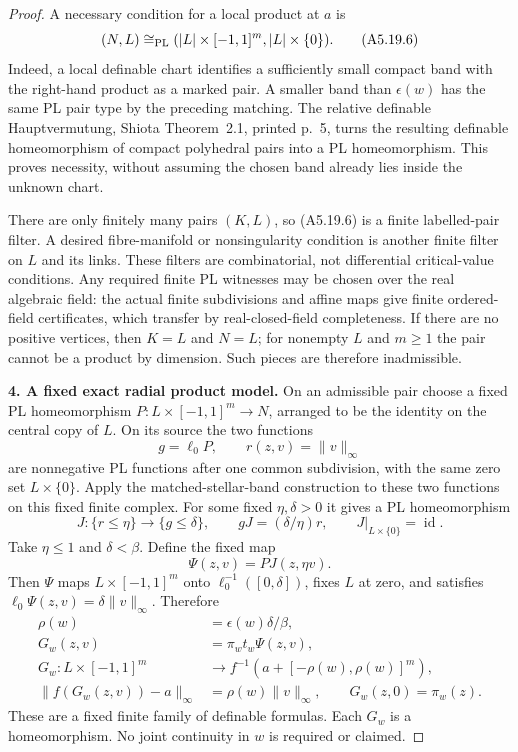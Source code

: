 \begin{proof}
A necessary condition for a local product at $a$ is
\[
 (N,L)\cong_{\rm PL}
 (|L|\times[-1,1]^m,|L|\times\{0\}).
 \tag{A5.19.6}
\]
Indeed, a local definable chart identifies a sufficiently small compact
band with the right-hand product as a marked pair. A smaller band than
$\epsilon(w)$ has the same PL pair type by the preceding matching.
The relative definable Hauptvermutung, Shiota Theorem~2.1, printed p.~5,
turns the resulting definable homeomorphism of compact polyhedral pairs
into a PL homeomorphism. This proves necessity, without assuming the
chosen band already lies inside the unknown chart.

There are only finitely many pairs $(K,L)$, so (A5.19.6) is a finite
labelled-pair filter. A desired fibre-manifold or nonsingularity condition
is another finite filter on $L$ and its links. These filters are
combinatorial, not differential critical-value conditions. Any required
finite PL witnesses may be chosen over the real algebraic field: the
actual finite subdivisions and affine maps give finite ordered-field
certificates, which transfer by real-closed-field completeness.
If there are no positive vertices, then $K=L$ and $N=L$; for nonempty $L$
and $m\ge1$ the pair cannot be a product by dimension. Such pieces are
therefore inadmissible.

\textbf{4. A fixed exact radial product model.}\quad
On an admissible pair choose a fixed PL homeomorphism
$P:L\times[-1,1]^m\to N$, arranged to be the identity on the central
copy of $L$. On its source the two functions
\[
 g=\ell_0P,\qquad r(z,v)=\|v\|_\infty
\]
are nonnegative PL functions after one common subdivision, with the same
zero set $L\times\{0\}$. Apply the matched-stellar-band construction to
these two functions on this fixed finite complex. For some fixed
$\eta,\delta>0$ it gives a PL homeomorphism
\[
 J:\{r\le\eta\}\longrightarrow\{g\le\delta\},
 \qquad gJ=(\delta/\eta)r,
 \qquad J|_{L\times\{0\}}=\operatorname{id}.
\]
Take $\eta\le1$ and $\delta<\beta$. Define the fixed map
\[
 \Psi(z,v)=P J(z,\eta v).
\]
Then $\Psi$ maps $L\times[-1,1]^m$ onto
$\ell_0^{-1}([0,\delta])$, fixes $L$ at zero, and satisfies
$\ell_0\Psi(z,v)=\delta\|v\|_\infty$. Therefore
\[
\begin{split}
 \rho(w)&=\epsilon(w)\delta/\beta,\\
 G_w(z,v)&=\pi_w t_w\Psi(z,v),\\
 G_w:L\times[-1,1]^m&\longrightarrow
 f^{-1}(a+[-\rho(w),\rho(w)]^m),\\
 \|f(G_w(z,v))-a\|_\infty&=\rho(w)\|v\|_\infty,
 \qquad G_w(z,0)=\pi_w(z).
\end{split}
\tag{A5.19.7}
\]
These are a fixed finite family of definable formulas. Each $G_w$ is a
homeomorphism. No joint continuity in $w$ is required or claimed.


\end{proof}
